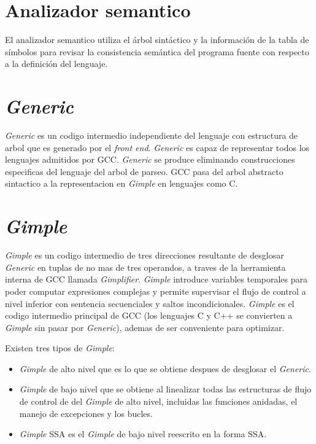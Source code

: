 \section{Analizador semantico}
El analizador semantico utiliza el árbol sintáctico y la información de la tabla de símbolos 
para revisar la consistencia semántica del programa fuente con respecto a la definición del lenguaje. 

\section{\emph{Generic}}

\emph{Generic} es un codigo intermedio independiente del lenguaje con estructura de arbol 
que es generado por el \emph{front end}. \emph{Generic} es capaz de representar todos los 
lenguajes admitidos por GCC. \emph{Generic} se produce eliminando construcciones especificas 
del lenguaje del arbol de parseo. 
GCC pasa del arbol abstracto sintactico a la representacion en \emph{Gimple} en lenguajes como C.

\section{\emph{Gimple}}

\emph{Gimple} es un codigo intermedio de tres direcciones resultante de desglosar \emph{Generic} en tuplas 
de no mas de tres operandos, a traves de la herramienta interna de GCC llamada \emph{Gimplifier}. 
\emph{Gimple} introduce variables temporales para poder computar expresiones complejas y permite 
supervisar el flujo de control a nivel inferior con sentencia secuenciales y saltos incondicionales. 
\emph{Gimple} es el codigo intermedio principal de GCC (los lenguajes C y C++ se convierten a \emph{Gimple} 
sin pasar por \emph{Generic}), ademas de ser conveniente para optimizar. 

Existen tres tipos de \emph{Gimple}:

\begin{itemize}
    \item \emph{Gimple} de alto nivel que es lo que se obtiene despues de desglosar el \emph{Generic}.
    \item \emph{Gimple} de bajo nivel que se obtiene al linealizar todas las estructuras de flujo de control de 
            del \emph{Gimple} de alto nivel, incluidas las funciones anidadas, el manejo de excepciones y los bucles.
    \item \emph{Gimple} SSA es el \emph{Gimple} de bajo nivel reescrito en la forma SSA.
\end{itemize}

